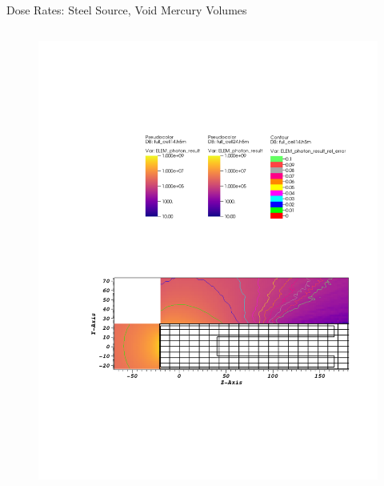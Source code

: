 \documentclass{beamer}
\begin{document}
\begin{frame}{Dose Rates: Steel Source, Void Mercury Volumes}
\begin{columns}[T]
        \begin{figure}
                \includegraphics[scale=0.49,trim={6.75cm 16.5cm 11cm 6cm},clip]{figs/dose_steel_cell_void.pdf}
        \end{figure}
\end{columns}

\begin{columns}[T]


\end{columns}
\end{frame}
\end{document}
